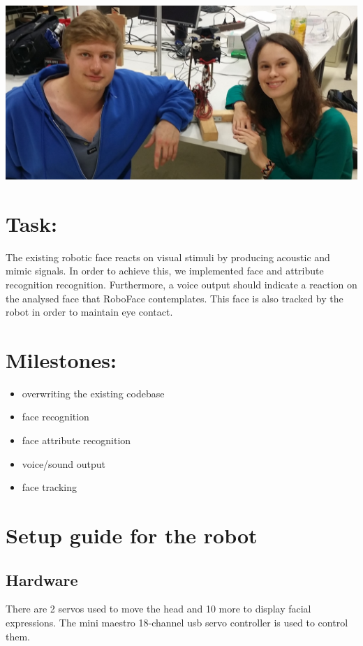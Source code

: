 \documentclass[12.5pt]{scrartcl}
\begin{document}
	\vspace*{8mm}
	\begin{center}
		\includegraphics[width=0.88\linewidth]{images/faceEdited}
	\end{center}
	
	\section{Task:}
	The existing robotic face reacts on visual stimuli by producing acoustic and mimic signals. In order to achieve this, we implemented face and attribute recognition recognition. Furthermore, a voice output should indicate a reaction on the analysed face that RoboFace contemplates. This face is also tracked by the robot in order to maintain eye contact. 
	
	\section{Milestones:}
	\begin{itemize}
		\item overwriting the existing codebase
		\item face recognition
		\item face attribute recognition
		\item voice/sound output
		\item face tracking
	\end{itemize}

	\section{Setup guide for the robot}
	\subsection{Hardware}
    There are 2 servos used to move the head and 10 more to display facial expressions. The mini maestro 18-channel usb servo controller is used
    to control them.
\end{document}
